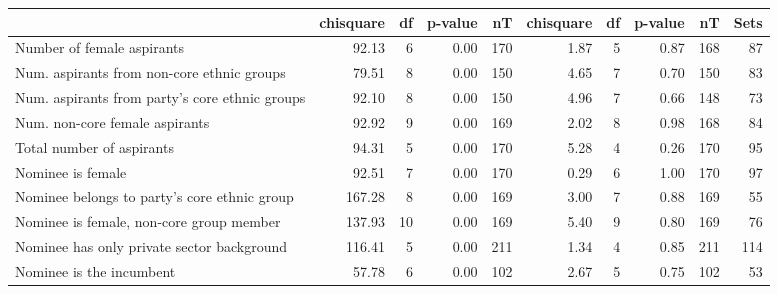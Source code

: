 \begin{table}[ht]
\centering
\label{tab:balance.main}
\begin{tabular}{lrrrrrrrrr}
  \hline
 & chisquare & df & p-value & nT & chisquare & df & p-value & nT & Sets \\ 
  \hline
Number of female aspirants & 92.13 & 6 & 0.00 & 170 & 1.87 & 5 & 0.87 & 168 & 87 \\ 
  Num. aspirants from non-core ethnic groups & 79.51 & 8 & 0.00 & 150 & 4.65 & 7 & 0.70 & 150 & 83 \\ 
  Num. aspirants from party's core ethnic groups & 92.10 & 8 & 0.00 & 150 & 4.96 & 7 & 0.66 & 148 & 73 \\ 
  Num. non-core female aspirants & 92.92 & 9 & 0.00 & 169 & 2.02 & 8 & 0.98 & 168 & 84 \\ 
  Total number of aspirants & 94.31 & 5 & 0.00 & 170 & 5.28 & 4 & 0.26 & 170 & 95 \\ 
  Nominee is female & 92.51 & 7 & 0.00 & 170 & 0.29 & 6 & 1.00 & 170 & 97 \\ 
  Nominee belongs to party's core ethnic group & 167.28 & 8 & 0.00 & 169 & 3.00 & 7 & 0.88 & 169 & 55 \\ 
  Nominee is female, non-core group member & 137.93 & 10 & 0.00 & 169 & 5.40 & 9 & 0.80 & 169 & 76 \\ 
  Nominee has only private sector background & 116.41 & 5 & 0.00 & 211 & 1.34 & 4 & 0.85 & 211 & 114 \\ 
  Nominee is the incumbent & 57.78 & 6 & 0.00 & 102 & 2.67 & 5 & 0.75 & 102 & 53 \\ 
   \hline
\end{tabular}
\end{table}
